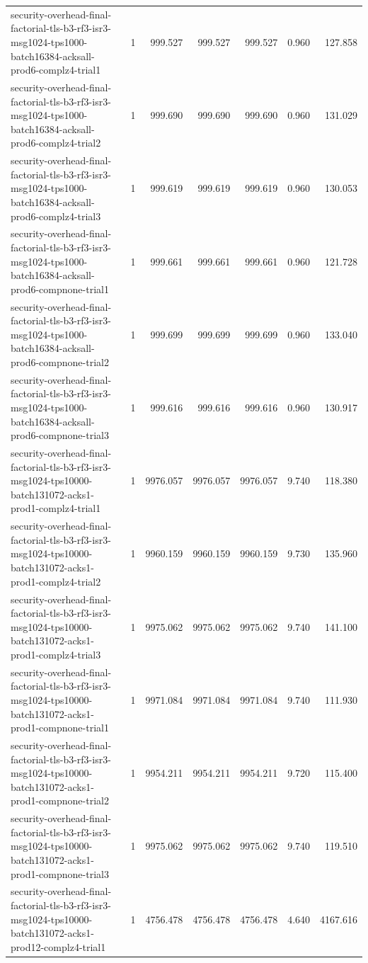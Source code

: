 \begin{tabular}{lrrrrrr}
security-overhead-final-factorial-tls-b3-rf3-isr3-msg1024-tps1000-batch16384-acksall-prod6-complz4-trial1 & 1 & 999.527 & 999.527 & 999.527 & 0.960 & 127.858 \\
security-overhead-final-factorial-tls-b3-rf3-isr3-msg1024-tps1000-batch16384-acksall-prod6-complz4-trial2 & 1 & 999.690 & 999.690 & 999.690 & 0.960 & 131.029 \\
security-overhead-final-factorial-tls-b3-rf3-isr3-msg1024-tps1000-batch16384-acksall-prod6-complz4-trial3 & 1 & 999.619 & 999.619 & 999.619 & 0.960 & 130.053 \\
security-overhead-final-factorial-tls-b3-rf3-isr3-msg1024-tps1000-batch16384-acksall-prod6-compnone-trial1 & 1 & 999.661 & 999.661 & 999.661 & 0.960 & 121.728 \\
security-overhead-final-factorial-tls-b3-rf3-isr3-msg1024-tps1000-batch16384-acksall-prod6-compnone-trial2 & 1 & 999.699 & 999.699 & 999.699 & 0.960 & 133.040 \\
security-overhead-final-factorial-tls-b3-rf3-isr3-msg1024-tps1000-batch16384-acksall-prod6-compnone-trial3 & 1 & 999.616 & 999.616 & 999.616 & 0.960 & 130.917 \\
security-overhead-final-factorial-tls-b3-rf3-isr3-msg1024-tps10000-batch131072-acks1-prod1-complz4-trial1 & 1 & 9976.057 & 9976.057 & 9976.057 & 9.740 & 118.380 \\
security-overhead-final-factorial-tls-b3-rf3-isr3-msg1024-tps10000-batch131072-acks1-prod1-complz4-trial2 & 1 & 9960.159 & 9960.159 & 9960.159 & 9.730 & 135.960 \\
security-overhead-final-factorial-tls-b3-rf3-isr3-msg1024-tps10000-batch131072-acks1-prod1-complz4-trial3 & 1 & 9975.062 & 9975.062 & 9975.062 & 9.740 & 141.100 \\
security-overhead-final-factorial-tls-b3-rf3-isr3-msg1024-tps10000-batch131072-acks1-prod1-compnone-trial1 & 1 & 9971.084 & 9971.084 & 9971.084 & 9.740 & 111.930 \\
security-overhead-final-factorial-tls-b3-rf3-isr3-msg1024-tps10000-batch131072-acks1-prod1-compnone-trial2 & 1 & 9954.211 & 9954.211 & 9954.211 & 9.720 & 115.400 \\
security-overhead-final-factorial-tls-b3-rf3-isr3-msg1024-tps10000-batch131072-acks1-prod1-compnone-trial3 & 1 & 9975.062 & 9975.062 & 9975.062 & 9.740 & 119.510 \\
security-overhead-final-factorial-tls-b3-rf3-isr3-msg1024-tps10000-batch131072-acks1-prod12-complz4-trial1 & 1 & 4756.478 & 4756.478 & 4756.478 & 4.640 & 4167.616 \\

\end{tabular}

